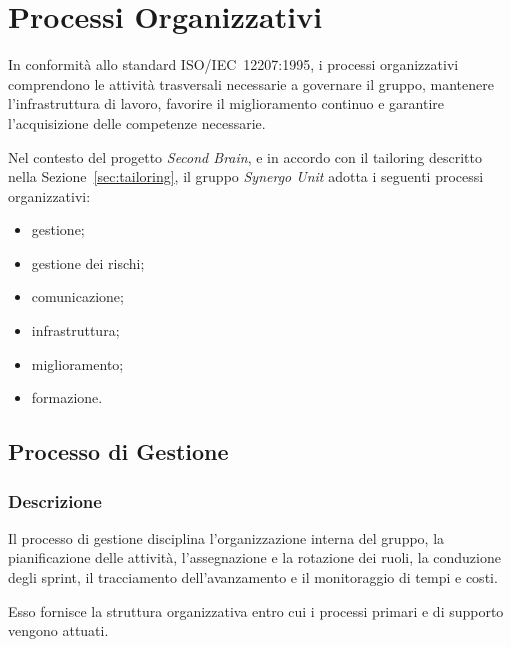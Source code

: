 
\section{Processi Organizzativi}
\label{sec:processi-organizzativi}

In conformità allo standard ISO/IEC~12207:1995, i processi
organizzativi comprendono le attività trasversali necessarie a governare il gruppo,
mantenere l'infrastruttura di lavoro, favorire il miglioramento continuo e garantire
l'acquisizione delle competenze necessarie.

Nel contesto del progetto \textit{Second Brain}, e in accordo con il tailoring
descritto nella Sezione~\ref{sec:tailoring}, il gruppo \textit{Synergo Unit} adotta
i seguenti processi organizzativi:

\begin{itemize}
    \item gestione;
    \item gestione dei rischi;
    \item comunicazione;
    \item infrastruttura;
    \item miglioramento;
    \item formazione.
\end{itemize}


\subsection{Processo di Gestione}
\label{sec:gestione}

\subsubsection{Descrizione}

Il processo di gestione disciplina l'organizzazione interna del gruppo, la
pianificazione delle attività, l'assegnazione e la rotazione dei ruoli, la
conduzione degli sprint, il tracciamento dell'avanzamento e il
monitoraggio di tempi e costi.

Esso fornisce la struttura organizzativa entro cui i processi primari e di supporto
vengono attuati.

